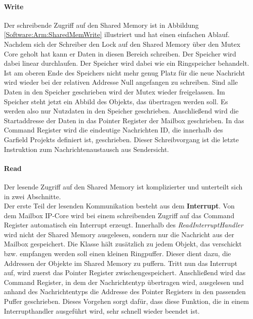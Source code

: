 \paragraph{Write}
Der schreibende Zugriff auf den Shared Memory ist in Abbildung \ref{Software:Arm:SharedMemWrite} illustriert und hat einen einfachen Ablauf. Nachdem sich der Schreiber den Lock auf den Shared Memory über den Mutex Core geholt hat kann er Daten in diesen Bereich schreiben. Der Speicher wird dabei linear durchlaufen. Der Speicher wird dabei wie ein Ringspeicher behandelt. Ist am oberen Ende des Speichers nicht mehr genug Platz für die neue Nachricht wird wieder bei der relativen Addresse Null angefangen zu schreiben. Sind alle Daten in den Speicher geschrieben wird der Mutex wieder freigelassen. Im Speicher steht jetzt ein Abbild des Objekts, das übertragen werden soll. Es werden also nur Nutzdaten in den Speicher geschrieben. Anschließend wird die Startaddresse der Daten in das Pointer Register der Mailbox geschrieben. In das Command Register wird die eindeutige Nachrichten ID, die innerhalb des Garfield Projekts definiert ist, geschrieben. Dieser Schreibvorgang ist die letzte Instruktion zum Nachrichtenaustausch aus Sendersicht.

\paragraph{Read}
Der lesende Zugriff auf den Shared Memory ist komplizierter und unterteilt sich in zwei Abschnitte.\\

Der erste Teil der lesenden Kommunikation besteht aus dem \textbf{Interrupt}. Von dem Mailbox \ac{IP}-Core wird bei einem schreibenden Zugriff auf das Command Register automatisch ein Interrupt erzeugt. Innerhalb des \textit{ReadInterruptHandler} wird nicht der Shared Memory ausgelesen, sondern nur die Nachricht aus der Mailbox gespeichert. Die Klasse hält zusätzlich zu jedem Objekt, das verschickt bzw. empfangen werden soll einen kleinen Ringpuffer. Dieser dient dazu, die Addressen der Objekte im Shared Memory zu puffern. Tritt nun das Interrupt auf, wird zuerst das Pointer Register zwischengespeichert. Anschließend wird das Command Register, in dem der Nachrichtentyp übertragen wird, ausgelesen und anhand des Nachrichtentyps die Addresse des Pointer Registers in den passenden Puffer geschrieben. Dieses Vorgehen sorgt dafür, dass diese Funktion, die in einem Interrupthandler ausgeführt wird, sehr schnell wieder beendet ist.\\

